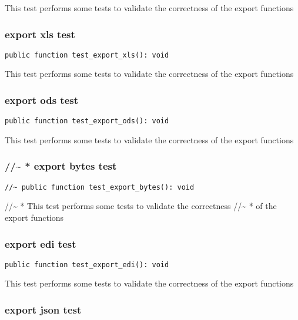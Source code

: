 \documentclass[a4paper]{article}
\begin{document}
This test performs some tests to validate the correctness
of the export functions

\hypertarget{toc161}{}
\subsubsection{export xls test}

\begin{lstlisting}
public function test_export_xls(): void
\end{lstlisting}

This test performs some tests to validate the correctness
of the export functions

\hypertarget{toc162}{}
\subsubsection{export ods test}

\begin{lstlisting}
public function test_export_ods(): void
\end{lstlisting}

This test performs some tests to validate the correctness
of the export functions

\hypertarget{toc163}{}
\subsubsection{//\~{} * export bytes test}

\begin{lstlisting}
//~ public function test_export_bytes(): void
\end{lstlisting}

//\~{} * This test performs some tests to validate the correctness
//\~{} * of the export functions

\hypertarget{toc164}{}
\subsubsection{export edi test}

\begin{lstlisting}
public function test_export_edi(): void
\end{lstlisting}

This test performs some tests to validate the correctness
of the export functions

\hypertarget{toc165}{}
\subsubsection{export json test}
\end{document}

